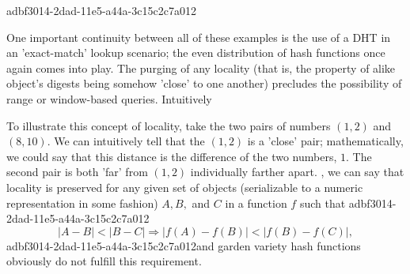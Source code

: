 \documentclass[12pt]{article}
\begin{document}
adbf3014-2dad-11e5-a44a-3c15c2c7a012\par One important continuity between all of these examples is the use of a DHT in an 'exact-match' lookup scenario; the even distribution of hash functions once again comes into play. The purging of any locality (that is, the property of alike object's digests being somehow 'close' to one another) precludes the possibility of range or window-based queries. Intuitively

\par To illustrate this concept of locality, take the two pairs of numbers $(1,2)$ and $(8,10)$. We can intuitively tell that the $(1,2)$ is a 'close' pair; mathematically, we could say that this distance is the difference of the two numbers, $1$. The second pair is both 'far' from $(1,2)$ individually farther apart. , we can say that locality is preserved for any given set of objects (serializable to a numeric representation in some fashion) $A,B,$ and $C$ in a function $f$ such that
adbf3014-2dad-11e5-a44a-3c15c2c7a012\begin{equation}
|A-B| < |B-C| \Rightarrow |f(A)-f(B)| < |f(B) - f(C)|,
\end{equation}
adbf3014-2dad-11e5-a44a-3c15c2c7a012and garden variety hash functions obviously do not fulfill this requirement.

\printbibliography
\end{document}
